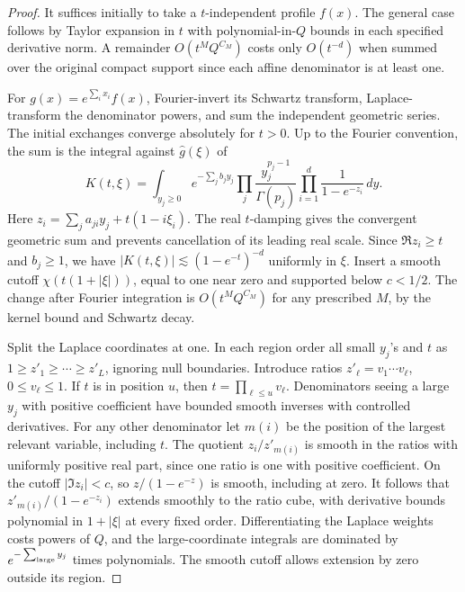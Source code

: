 \begin{proof}
It suffices initially to take a \(t\)-independent profile \(f(x)\).
The general case follows by Taylor expansion in \(t\) with
polynomial-in-\(Q\) bounds in each specified derivative norm.
A remainder \(O(t^M Q^{C_M})\) costs only \(O(t^{-d})\) when summed
over the original compact support since each affine denominator
is at least one.

For \(g(x)=e^{\sum_i x_i}f(x)\), Fourier-invert its Schwartz
transform, Laplace-transform the denominator powers, and sum
the independent geometric series. The initial exchanges converge
absolutely for \(t>0\). Up to the Fourier convention, the sum is
the integral against \(\widehat g(\xi)\) of
\begin{equation}
 K(t,\xi)=\int_{y_j\ge0} e^{-\sum_j b_jy_j}
       \prod_j\frac{y_j^{p_j-1}}{\Gamma(p_j)}
       \prod_{i=1}^d\frac{1}{1-e^{-z_i}}\,dy .
 \label{rad:laplace}
\end{equation}
Here \(z_i=\sum_j a_{ji}y_j+t(1-i\xi_i)\). The real \(t\)-damping gives the convergent geometric sum and
prevents cancellation of its leading real scale. Since
\(\Re z_i\ge t\) and \(b_j\ge1\), we have
\(|K(t,\xi)|\lesssim (1-e^{-t})^{-d}\) uniformly in \(\xi\).
Insert a smooth cutoff \(\chi(t(1+|\xi|))\), equal to one near
zero and supported below \(c<1/2\). The change after Fourier
integration is \(O(t^M Q^{C_M})\) for any prescribed \(M\),
by the kernel bound and Schwartz decay.

Split the Laplace coordinates at one. In each region order all
small \(y_j\)'s and \(t\) as \(1\ge z'_1\ge\cdots\ge z'_L\),
ignoring null boundaries. Introduce ratios
\(z'_\ell=v_1\cdots v_\ell\), \(0\le v_\ell\le1\). If \(t\)
is in position \(u\), then \(t=\prod_{\ell\le u}v_\ell\).
Denominators seeing a large \(y_j\) with positive coefficient
have bounded smooth inverses with controlled derivatives.
For any other denominator let \(m(i)\) be the position of the
largest relevant variable, including \(t\). The quotient
\(z_i/z'_{m(i)}\) is smooth in the ratios with uniformly
positive real part, since one ratio is one with positive
coefficient. On the cutoff \(|\Im z_i|<c\), so
\(z/(1-e^{-z})\) is smooth, including at zero. It follows
that \(z'_{m(i)}/(1-e^{-z_i})\) extends smoothly to the
ratio cube, with derivative bounds polynomial in \(1+|\xi|\)
at every fixed order. Differentiating the Laplace weights
costs powers of \(Q\), and the large-coordinate integrals
are dominated by \(e^{-\sum_{\rm large}y_j}\) times polynomials.
The smooth cutoff allows extension by zero outside its region.


\end{proof}
